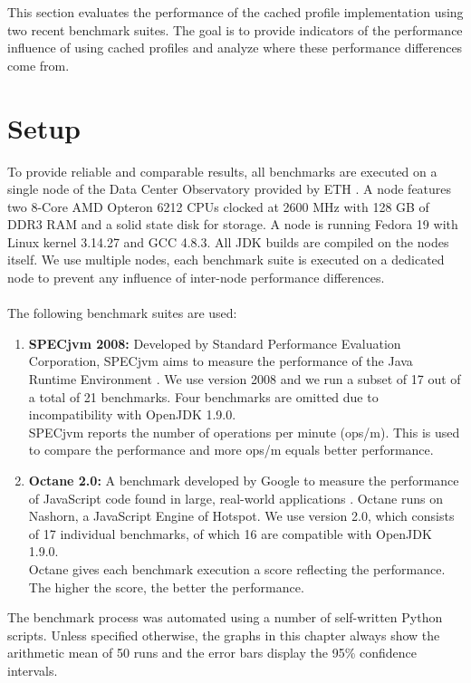 This section evaluates the performance of the cached profile implementation using two recent benchmark suites. The goal is to provide indicators of the performance influence of using cached profiles and analyze where these performance differences come from.
\section{Setup}
\label{s:perf_setup}
To provide reliable and comparable results, all benchmarks are executed on a single node of the Data Center Observatory provided by ETH \cite{ethdco}.
A node features two 8-Core AMD Opteron 6212 CPUs clocked at 2600 MHz with 128 GB of DDR3 RAM and a solid state disk for storage.
A node is running Fedora 19 with Linux kernel 3.14.27 and GCC 4.8.3. All JDK builds are compiled on the nodes itself. We use multiple nodes, each benchmark suite is executed on a dedicated node to prevent any influence of inter-node performance differences.
\\\\
The following benchmark suites are used:
\begin{enumerate}
  \item \textbf{SPECjvm 2008:} Developed by Standard Performance Evaluation Corporation, SPECjvm aims to measure the performance of the Java Runtime Environment \cite{specjvm}.  We use version 2008 and we run a subset of 17 out of a total of 21 benchmarks. Four benchmarks are omitted due to incompatibility with OpenJDK 1.9.0.
  \\
  SPECjvm reports the number of operations per minute (ops/m). This is used to compare the performance and more ops/m equals better performance.
  \item \textbf{Octane 2.0:} A benchmark developed by Google to measure the performance of JavaScript code found in large, real-world applications \cite{octane}. Octane runs on Nashorn, a JavaScript Engine of Hotspot. We use version 2.0, which consists of 17 individual benchmarks, of which 16 are compatible with OpenJDK 1.9.0. 
  \\
  Octane gives each benchmark execution a score reflecting the performance. The higher the score, the better the performance.
\end{enumerate}
The benchmark process was automated using a number of self-written Python scripts. Unless specified otherwise, the graphs in this chapter always show the arithmetic mean of 50 runs and the error bars display the 95\% confidence intervals.

